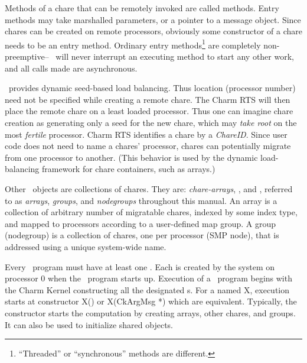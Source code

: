 Methods of a chare that can be remotely invoked are called
 methods.  Entry methods may take marshalled
parameters, or a pointer to a message object.  Since chares can
be created on remote processors, obviously some constructor of a chare needs
to be an entry method.  Ordinary entry methods\footnote{``Threaded'' or
``synchronous'' methods are different.} are completely non-preemptive--
\charmpp\ will never interrupt an executing method to start any other work,
and all calls made are asynchronous.

\charmpp\ provides dynamic seed-based load balancing. Thus location (processor
number) need not be specified while creating a remote chare. The
Charm RTS will then place the remote chare on a least loaded processor. Thus
one can imagine chare creation as generating only a seed for the new chare,
which may {\em take root} on the most {\em fertile} processor. Charm RTS
identifies a chare by a {\em ChareID}.  Since user code does not
need to name a chares' processor, chares can potentially migrate from one
processor to another.  (This behavior is used by the dynamic load-balancing
framework for chare containers, such as arrays.)

Other \charmpp\ objects are collections of chares. They are: {\em
chare-arrays}, , and , referred to as {\em arrays}, {\em groups}, and {\em
nodegroups} throughout this manual. An array is a collection of arbitrary
number of migratable chares, indexed by some index type, and mapped to
processors according to a user-defined map group. A group (nodegroup) is a
collection of chares, one per processor (SMP node), that is addressed using
a unique system-wide name.

Every \charmpp\ program must have at least one .  Each
 is created by the system on processor 0 when the \charmpp\
program starts up.  Execution of a \charmpp\ program begins with the Charm
Kernel constructing all the designated s.  For a \kw{mainchare} named X, execution starts at constructor X() or X(CkArgMsg *) which are equivalent.
Typically, the
 constructor starts the computation by creating arrays, other
chares, and groups.  It can also be used to initialize shared \kw{readonly}
objects.

